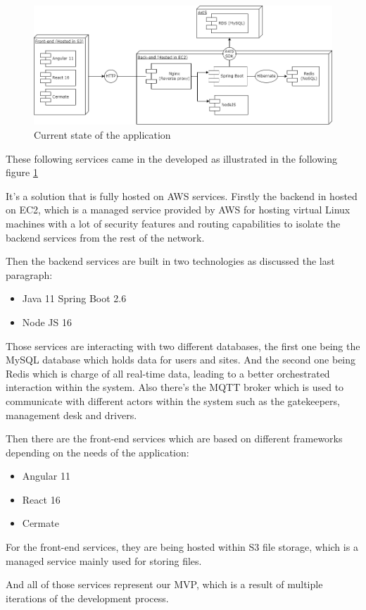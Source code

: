\begin{figure}[!htpb]
    \centering
    \includegraphics[width=\textwidth]{images/State-of-art}
    \caption{\footnotesize{Current state of the application}}
    \label{fig:state-of-art}
\end{figure}

These following services came in the developed as illustrated
in the following figure \ref{fig:state-of-art}

It's a solution that is fully hosted on AWS services.
Firstly the backend in hosted on EC2, which is a managed service provided by AWS for
hosting virtual Linux machines with a lot of security features and routing capabilities
to isolate the backend services from the rest of the network.

Then the backend services are built in two technologies as discussed the last paragraph:
    \begin{itemize}
        \item Java 11 Spring Boot 2.6
        \item Node JS 16
    \end{itemize}

Those services are interacting with two different databases, the first one being
the MySQL database which holds data for users and sites.
And the second one being Redis which is charge of all real-time data, leading to a better
orchestrated interaction within the system.
Also there's the MQTT broker which is used to communicate with different actors within 
the system such as the gatekeepers, management desk and drivers.

Then there are the front-end services which are based on different frameworks depending 
on the needs of the application:
    \begin{itemize}
        \item Angular 11
        \item React 16
        \item Cermate
    \end{itemize}

For the front-end services, they are being hosted within S3 file storage, which is 
a managed service mainly used for storing files.

And all of those services represent our MVP, which is a result of multiple iterations
of the development process.
